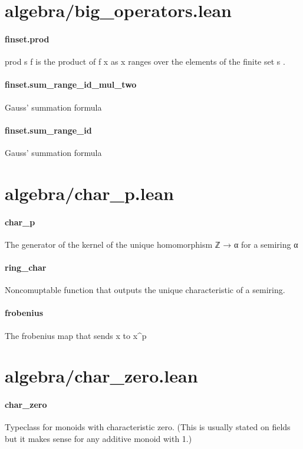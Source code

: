 \documentclass{article}
\begin{document}
\section{algebra/big\_operators.lean}\paragraph{finset.prod}
\par
\colorbox[RGB]{253,246,227}{{{{\color[RGB]{101, 123, 131} prod s f }}}} is the product of 
\colorbox[RGB]{253,246,227}{{{{\color[RGB]{101, 123, 131} f x }}}} as 
\colorbox[RGB]{253,246,227}{{{{\color[RGB]{101, 123, 131} x }}}} ranges over the elements of the finite set 
\colorbox[RGB]{253,246,227}{{{{\color[RGB]{101, 123, 131} s }}}}.
\paragraph{finset.sum\_range\_id\_mul\_two}
\par
Gauss' summation formula
\paragraph{finset.sum\_range\_id}
\par
Gauss' summation formula
\section{algebra/char\_p.lean}\paragraph{char\_p}
\par
The generator of the kernel of the unique homomorphism ℤ → α for a semiring α
\paragraph{ring\_char}
\par
Noncomuptable function that outputs the unique characteristic of a semiring.
\paragraph{frobenius}
\par
The frobenius map that sends x to x\textasciicircum{}p
\section{algebra/char\_zero.lean}\paragraph{char\_zero}
\par
Typeclass for monoids with characteristic zero.
(This is usually stated on fields but it makes sense for any additive monoid with 1.)
\end{document}
